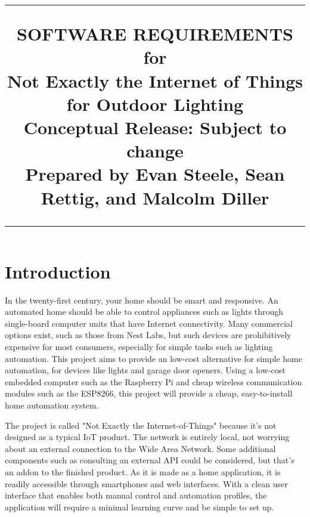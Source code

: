 \documentclass[oneside,openright]{book}
\title{
	\flushright
		\rule{16cm}{5pt}\vskip1cm
		\Huge{SOFTWARE REQUIREMENTS}\\
	for\\
		\vspace{2cm}
	Not Exactly the Internet of Things for Outdoor Lighting\\
		\vspace{2cm}
	\LARGE{Conceptual Release:}
	\vspace{2cm}
	\LARGE{Subject to change\\}
	\vspace{2cm}
	Prepared by Evan Steele, Sean Rettig, and Malcolm Diller\\
		\vfill
		\rule{16cm}{5pt}
}
\date{}
\begin{document}
\maketitle
\tableofcontents
\newpage

\section{Introduction}

In the twenty-first century, your home should be smart and responsive. An
automated home should be able to control appliances such as lights through
single-board computer units that have Internet connectivity. Many commercial
options exist, such as those from Nest Labs, but such devices are prohibitively
expensive for most consumers, especially for simple tasks such as lighting
automation. This project aims to provide an low-cost alternative for simple
home automation, for devices like lights and garage door openers. Using a
low-cost embedded computer such as the Raspberry Pi and cheap wireless
communication modules such as the ESP8266, this project will provide a cheap,
easy-to-install home automation system.

The project is called "Not Exactly the Internet-of-Things" because it's not
designed as a typical IoT product. The network is entirely local, not worrying
about an external connection to the Wide Area Network. Some additional
components such as consulting an external API could be considered, but that's
an addon to the finished product. As it is made as a home application, it
is readily accessible through smartphones and web interfaces. With a clean user
interface that enables both manual control and automation profiles, the
application will require a minimal learning curve and be simple to set up.  
\end{document}

